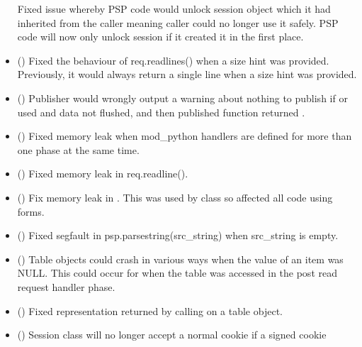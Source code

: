 \begin{itemize}
      Fixed issue whereby PSP code would unlock session object which it had
      inherited from the caller meaning caller could no longer use it safely.
      PSP code will now only unlock session if it created it in the first
      place.
    \item
      ()
      Fixed the behaviour of req.readlines() when a size hint was provided. Previously,
      it would always return a single line when a size hint was provided.
    \item
      ()
      Publisher would wrongly output a warning about nothing to publish if
       or  used and data not flushed,
      and then published function returned .
    \item
      ()
      Fixed memory leak when mod_python handlers are defined for more than
      one phase at the same time.
    \item
      ()
      Fixed memory leak in req.readline().
    \item
      ()
      Fix memory leak in . This was used by
       class so affected all code using forms.
    \item
      ()
      Fixed segfault in psp.parsestring(src_string) when src_string is empty.
    \item
      ()
      Table objects could crash in various ways when the value of an item
      was NULL. This could occur for  when the
       table was accessed in the post read request
      handler phase.
    \item
      ()
      Fixed representation returned by calling  on a table object.
    \item
      ()
      Session class will no longer accept a normal cookie if a signed cookie

\end{itemize}
